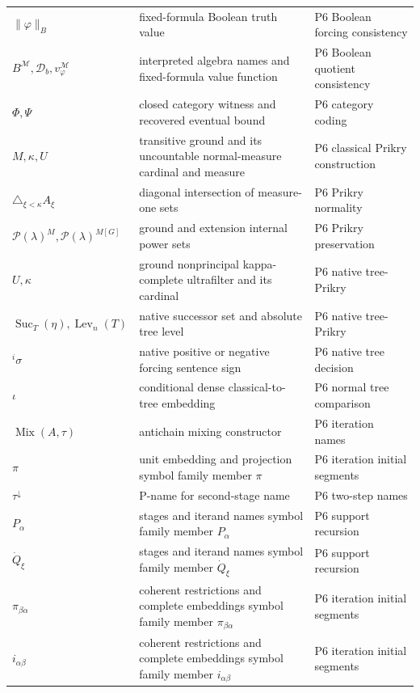 \begin{longtable}{@{}p{}p{}p{}@{}}
\(\lVert\varphi\rVert_B\) & fixed-formula Boolean truth value & P6 Boolean forcing consistency \\
\(B^{\mathcal M},\allowbreak \mathcal D_b,\allowbreak v^{\mathcal M}_\varphi\) & interpreted algebra names and fixed-formula value function & P6 Boolean quotient consistency \\
\(\Phi,\allowbreak \Psi\) & closed category witness and recovered eventual bound & P6 category coding \\
\(M,\allowbreak \kappa,\allowbreak U\) & transitive ground and its uncountable normal-measure cardinal and measure & P6 classical Prikry construction \\
\(\triangle_{\xi<\kappa}A_\xi\) & diagonal intersection of measure-one sets & P6 Prikry normality \\
\(\mathcal P(\lambda)^M,\allowbreak \mathcal P(\lambda)^{M[G]}\) & ground and extension internal power sets & P6 Prikry preservation \\
\(U,\allowbreak \kappa\) & ground nonprincipal kappa-complete ultrafilter and its cardinal & P6 native tree-\allowbreak{}Prikry \\
\(\operatorname{Suc}_T(\eta),\allowbreak \operatorname{Lev}_n(T)\) & native successor set and absolute tree level & P6 native tree-\allowbreak{}Prikry \\
\({}^{i}\sigma\) & native positive or negative forcing sentence sign & P6 native tree decision \\
\(\iota\) & conditional dense classical-to-tree embedding & P6 normal tree comparison \\
\(\operatorname{Mix}(A,\allowbreak \tau)\) & antichain mixing constructor & P6 iteration names \\
\(\pi\) & unit embedding and projection symbol family member \(\pi\) & P6 iteration initial segments \\
\(\tau^\downarrow\) & P-name for second-stage name & P6 two-\allowbreak{}step names \\
\(P_\alpha\) & stages and iterand names symbol family member \(P_\alpha\) & P6 support recursion \\
\(\dot Q_\xi\) & stages and iterand names symbol family member \(\dot Q_\xi\) & P6 support recursion \\
\(\pi_{\beta\alpha}\) & coherent restrictions and complete embeddings symbol family member \(\pi_{\beta\alpha}\) & P6 iteration initial segments \\
\(i_{\alpha\beta}\) & coherent restrictions and complete embeddings symbol family member \(i_{\alpha\beta}\) & P6 iteration initial segments \\

\end{longtable}
